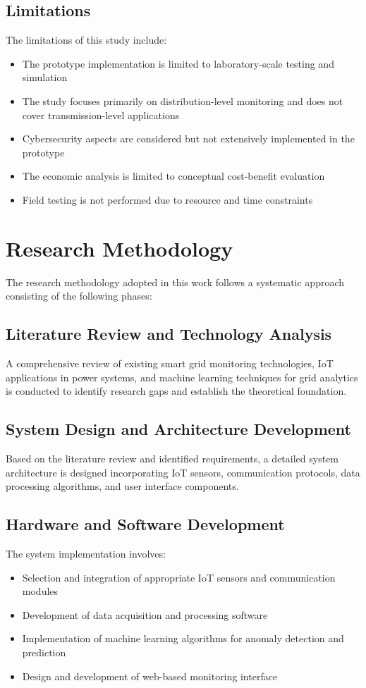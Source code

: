 \subsection{Limitations}
The limitations of this study include:

\begin{itemize}
\item The prototype implementation is limited to laboratory-scale testing and simulation
\item The study focuses primarily on distribution-level monitoring and does not cover transmission-level applications
\item Cybersecurity aspects are considered but not extensively implemented in the prototype
\item The economic analysis is limited to conceptual cost-benefit evaluation
\item Field testing is not performed due to resource and time constraints
\end{itemize}

\section{Research Methodology}
\label{sec:methodology_overview}

The research methodology adopted in this work follows a systematic approach consisting of the following phases:

\subsection{Literature Review and Technology Analysis}
A comprehensive review of existing smart grid monitoring technologies, IoT applications in power systems, and machine learning techniques for grid analytics is conducted to identify research gaps and establish the theoretical foundation.

\subsection{System Design and Architecture Development}
Based on the literature review and identified requirements, a detailed system architecture is designed incorporating IoT sensors, communication protocols, data processing algorithms, and user interface components.

\subsection{Hardware and Software Development}
The system implementation involves:
\begin{itemize}
\item Selection and integration of appropriate IoT sensors and communication modules
\item Development of data acquisition and processing software
\item Implementation of machine learning algorithms for anomaly detection and prediction
\item Design and development of web-based monitoring interface
\end{itemize}

